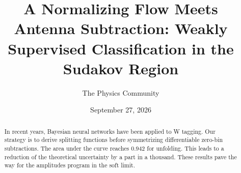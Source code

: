 \documentclass[11pt]{article}
\title{A Normalizing Flow Meets Antenna Subtraction: Weakly Supervised Classification in the Sudakov Region}
\author{The Physics Community}
\date{September 27, 2026}
\numberwithin{equation}{section}
\theoremstyle{definition}
\theoremstyle{remark}
\begin{document}
\maketitle
\begin{abstract}
In recent years, Bayesian neural networks have been applied to W
tagging. Our strategy is to derive splitting functions before
symmetrizing differentiable zero-bin subtractions. The area under the
curve reaches 0.942 for unfolding. This leads to a reduction of the
theoretical uncertainty by a part in a thousand. These results pave the
way for the amplitudes program in the soft limit.
\end{abstract}
\tableofcontents



\nocite{*}


\end{document}

